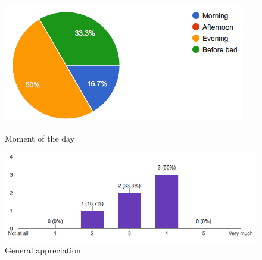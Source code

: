 \begin{figure}[!ht]
	\centering
	\begin{minipage}{.5\textwidth}
		\centering
		\includegraphics[scale=0.5]{Figures/responses/application_period_of_usage.png}
		\caption{Moment of the day}
		\label{fig:int_improving_lang}
	\end{minipage}%
	\begin{minipage}{.5\textwidth}
		\centering
		\includegraphics[scale=0.5]{Figures/responses/application_liked.png}
		\caption{General appreciation}
		\label{fig:int_usage_smartphone}
	\end{minipage}%
\end{figure}

